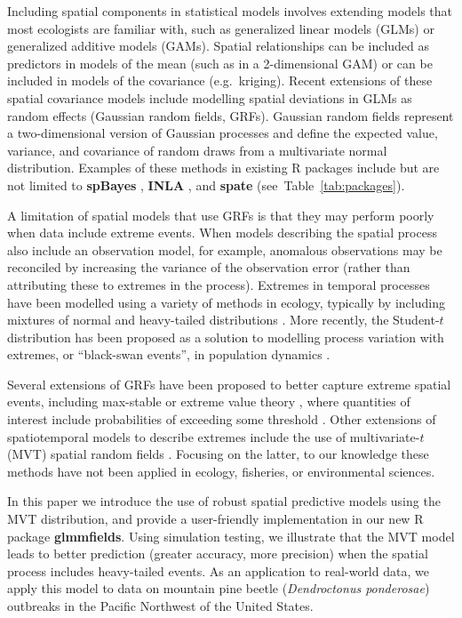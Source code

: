 \documentclass[12pt,english]{article}
\newcommand{\R}[1]{\label{#1}\linelabel{#1}}
\begin{document}
\begin{spacing}{1.8}
Including spatial components in statistical models involves extending models
that most ecologists are familiar with, such as generalized linear
models (GLMs) or generalized additive models (GAMs). Spatial relationships can
be included as predictors in models of the mean (such as in a 2-dimensional GAM)
or can be included in models of the covariance (e.g.\ kriging). Recent
extensions of these spatial covariance models include modelling spatial
deviations in GLMs as random effects (Gaussian random fields, GRFs).
Gaussian random fields represent a two-dimensional version of Gaussian
processes and define the expected value, variance, and covariance of
random draws from a multivariate normal distribution.\R{B6}
Examples of these methods in existing R packages include but are not limited to
\textbf{spBayes} \citep{finley2007}, \textbf{INLA} \citep{rue2009}, and
\textbf{spate} \citep{sigrist2015} (see~Table~\ref{tab:packages}).

A limitation of spatial models that use GRFs is that they may perform poorly
when data include extreme events. When models describing the spatial process
also include an observation model, for example, anomalous observations may be
reconciled by increasing the variance of the observation error (rather than
attributing these to extremes in the process). Extremes in temporal processes
have been modelled using a variety of methods in ecology, typically by including
mixtures of normal and heavy-tailed distributions \citep[e.g.][]{everitt1996,
  ward2007, thorson2011}. More recently, the Student-$t$ distribution has been
proposed as a solution to modelling process variation with extremes, or
``black-swan events'', in population dynamics \citep{anderson2017}.

Several extensions of GRFs have been proposed to better capture extreme spatial
events, including max-stable or extreme value theory \citep{davison2012,
  davison2012a}, where quantities of interest include probabilities of exceeding
some threshold \citep{davis2008}. Other extensions of spatiotemporal models to
describe extremes include the use of multivariate-$t$ (MVT) spatial random
fields \citep{roislien2007}. Focusing on the latter, to our knowledge these
methods have not been applied in ecology, fisheries, or environmental sciences.

In this paper we introduce the use of robust spatial predictive models using the
MVT distribution, and provide a user-friendly implementation in our new R
package \textbf{glmmfields}. Using simulation testing, we illustrate that the
MVT model leads to better prediction (greater accuracy, more precision) when the
spatial process includes heavy-tailed events. As an application to real-world data, we
apply this model to data on mountain pine beetle (\textit{Dendroctonus
  ponderosae}) outbreaks in the Pacific Northwest of the United States.


\end{spacing}
\end{document}
